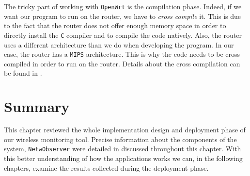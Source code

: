 The tricky part of working with \texttt{OpenWrt} is the compilation phase. Indeed, if we want our program to run on the router, we have to \textit{cross compile} it. This is due to the fact that the router does not offer enough memory space in order to directly install the \texttt{C} compiler and to compile the code natively. Also, the router uses a different architecture than we do when developing the program. In our case, the router has a \texttt{MIPS} architecture. This is why the code needs to be cross compiled in order to run on the router. Details about the cross compilation can be found in \cite{crosscompile}.



\section{Summary}
This chapter reviewed the whole implementation design and deployment phase of our wireless monitoring tool. Precise information about the components of the system, \texttt{NetwObserver} were detailed in discussed throughout this chapter. With this better understanding of how the applications works we can, in the following chapters, examine the results collected during the deployment phase. 
